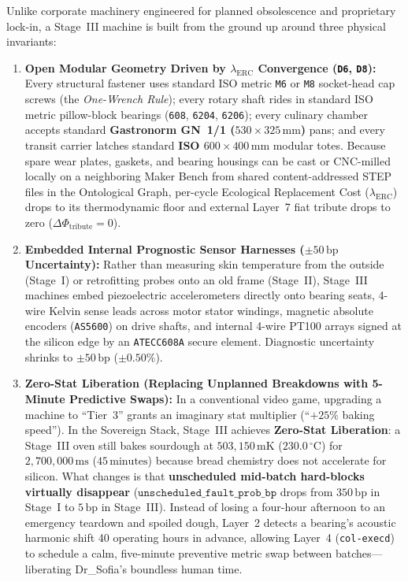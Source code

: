 Unlike corporate machinery engineered for planned obsolescence and proprietary lock-in, a Stage~III machine is built from the ground up around three physical invariants:
\begin{enumerate}
    \item \textbf{Open Modular Geometry Driven by $\lambda_{\mathrm{ERC}}$ Convergence (\texttt{D6}, \texttt{D8}):} Every structural fastener uses standard ISO metric \texttt{M6} or \texttt{M8} socket-head cap screws (the \textit{One-Wrench Rule}); every rotary shaft rides in standard ISO metric pillow-block bearings (\texttt{608}, \texttt{6204}, \texttt{6206}); every culinary chamber accepts standard \textbf{Gastronorm GN~1/1 ($530 \times 325\,\mathrm{mm}$)} pans; and every transit carrier latches standard \textbf{ISO $600 \times 400\,\mathrm{mm}$} modular totes. Because spare wear plates, gaskets, and bearing housings can be cast or CNC-milled locally on a neighboring Maker Bench from shared content-addressed STEP files in the Ontological Graph, per-cycle Ecological Replacement Cost ($\lambda_{\mathrm{ERC}}$) drops to its thermodynamic floor and external Layer~7 fiat tribute drops to zero ($\Delta \Phi_{\mathrm{tribute}} = 0$).
    \item \textbf{Embedded Internal Prognostic Sensor Harnesses ($\pm 50\,\mathrm{bp}$ Uncertainty):} Rather than measuring skin temperature from the outside (Stage~I) or retrofitting probes onto an old frame (Stage~II), Stage~III machines embed piezoelectric accelerometers directly onto bearing seats, 4-wire Kelvin sense leads across motor stator windings, magnetic absolute encoders (\texttt{AS5600}) on drive shafts, and internal 4-wire PT100 arrays signed at the silicon edge by an \texttt{ATECC608A} secure element. Diagnostic uncertainty shrinks to $\pm 50\,\mathrm{bp}$ ($\pm 0.50\%$).
    \item \textbf{Zero-Stat Liberation (Replacing Unplanned Breakdowns with 5-Minute Predictive Swaps):} In a conventional video game, upgrading a machine to ``Tier~3'' grants an imaginary stat multiplier (``$+25\%$ baking speed''). In the Sovereign Stack, Stage~III achieves \textbf{Zero-Stat Liberation}: a Stage~III oven still bakes sourdough at $503{,}150\,\mathrm{mK}$ ($230.0\,^\circ\mathrm{C}$) for $2{,}700{,}000\,\mathrm{ms}$ ($45\,\mathrm{minutes}$) because bread chemistry does not accelerate for silicon. What changes is that \textbf{unscheduled mid-batch hard-blocks virtually disappear} ($\mathtt{unscheduled\_fault\_prob\_bp}$ drops from $350\,\mathrm{bp}$ in Stage~I to $5\,\mathrm{bp}$ in Stage~III). Instead of losing a four-hour afternoon to an emergency teardown and spoiled dough, Layer~2 detects a bearing's acoustic harmonic shift 40 operating hours in advance, allowing Layer~4 (\texttt{col-execd}) to schedule a calm, five-minute preventive metric swap between batches---liberating Dr\_Sofia's boundless human time.
\end{enumerate}

